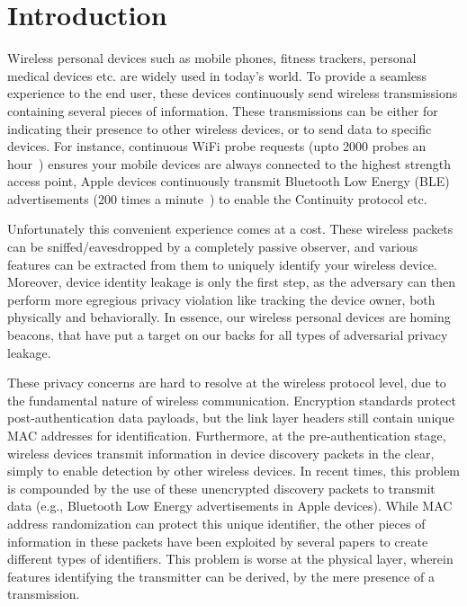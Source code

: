 \section{Introduction}
\label{sec:intro}

Wireless personal devices such as mobile phones, fitness trackers, personal medical devices etc. are widely used in today's world. 
%
To provide a seamless experience to the end user, these devices continuously send wireless transmissions containing several pieces of information. 
%
These transmissions can be either for indicating their presence to other wireless devices, or to send data to specific devices.
%
For instance, continuous WiFi probe requests (upto 2000 probes an hour~\cite{sn1}) ensures your mobile devices are always connected to the highest strength access point, Apple devices continuously transmit Bluetooth Low Energy (BLE) advertisements (200 times a minute~\cite{sn2}) to enable the Continuity protocol etc. 
%

Unfortunately this convenient experience comes at a cost. 
%
These wireless packets can be sniffed/eavesdropped by a completely passive observer, and various features can be extracted from them to uniquely identify your wireless device.
%
Moreover, device identity leakage is only the first step, as the adversary can then perform more egregious privacy violation like tracking the device owner, both physically and behaviorally.
%
In essence, our wireless personal devices are homing beacons, that have put a target on our backs for all types of adversarial privacy leakage.
%

These privacy concerns are hard to resolve at the wireless protocol level, due to the fundamental nature of wireless communication. 
%
Encryption standards protect post-authentication data payloads, but the link layer headers still contain unique MAC addresses for identification. 
%
Furthermore, at the pre-authentication stage, wireless devices transmit information in device discovery packets in the clear, simply to enable detection by other wireless devices. 
%
In recent times, this problem is compounded by the use of these unencrypted discovery packets to transmit data (e.g., Bluetooth Low Energy advertisements in Apple devices). While MAC address randomization can protect this unique identifier, the other pieces of information in these packets have been exploited by several papers to create different types of identifiers. 
%
This problem is worse at the physical layer, wherein features identifying the transmitter can be derived, by the mere presence of a transmission.
%

